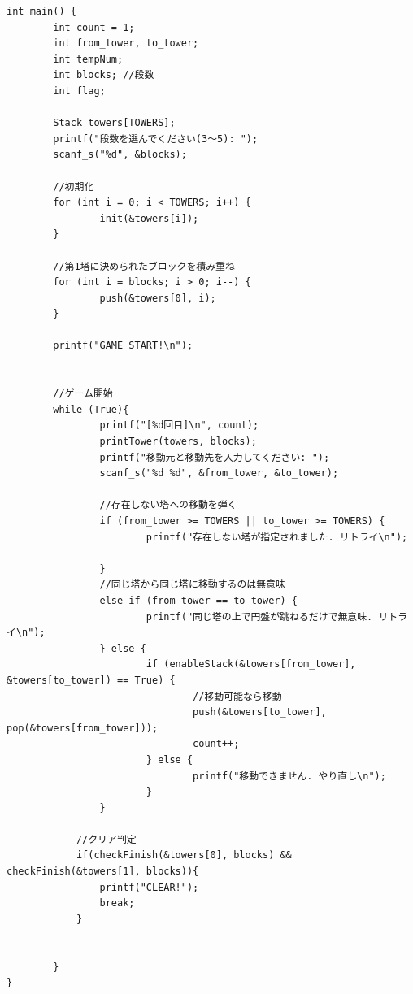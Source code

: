 \documentclass[a4j]{jsarticle}
\begin{document}
\begin{lstlisting}[label = hanoiAll, caption = ハノイの塔プログラム]
int main() {
        int count = 1;
        int from_tower, to_tower;
        int tempNum;
        int blocks; //段数
        int flag;

        Stack towers[TOWERS];
        printf("段数を選んでください(3〜5): ");
        scanf_s("%d", &blocks);

        //初期化
        for (int i = 0; i < TOWERS; i++) {
                init(&towers[i]);
        }

        //第1塔に決められたブロックを積み重ね
        for (int i = blocks; i > 0; i--) {
                push(&towers[0], i);
        }

        printf("GAME START!\n");


        //ゲーム開始
        while (True){
                printf("[%d回目]\n", count);
                printTower(towers, blocks);
                printf("移動元と移動先を入力してください: ");
                scanf_s("%d %d", &from_tower, &to_tower);

                //存在しない塔への移動を弾く
                if (from_tower >= TOWERS || to_tower >= TOWERS) {
                        printf("存在しない塔が指定されました. リトライ\n");

                }
                //同じ塔から同じ塔に移動するのは無意味
                else if (from_tower == to_tower) {
                        printf("同じ塔の上で円盤が跳ねるだけで無意味. リトライ\n");
                } else {
                        if (enableStack(&towers[from_tower], &towers[to_tower]) == True) {
                                //移動可能なら移動
                                push(&towers[to_tower], pop(&towers[from_tower]));
                                count++;
                        } else {
                                printf("移動できません. やり直し\n");
                        }
                }
            
            //クリア判定
            if(checkFinish(&towers[0], blocks) && checkFinish(&towers[1], blocks)){
                printf("CLEAR!");
                break;
            }
            
            
        }
}

    \end{lstlisting}
\end{document}
